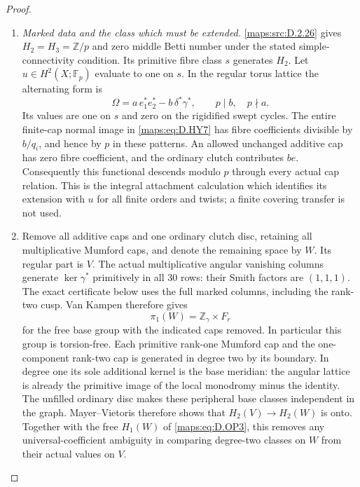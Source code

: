 \begin{proof}
\begin{enumerate}[label=\arabic*.,leftmargin=*]
\item \emph{Marked data and the class which must be extended.}
\ref{maps:src:D.2.26} gives $H_2=H_3=\mathbb Z/p$ and zero middle Betti number
under the stated simple-connectivity condition. Its primitive fibre
class $s$ generates $H_2$. Let $u\in H^2(X;\mathbb F_p)$ evaluate
to one on $s$. In the regular torus lattice the alternating form is
\[
 \Omega=a\,e_1^*e_2^*-b\,\delta^*\gamma^*,\qquad p\mid b,
                                      \quad p\nmid a.
 \tag{D.OP2}\label{maps:eq:D.OP2}
\]
Its values are one on $s$ and zero on the rigidified swept cycles.
The entire finite-cap normal image in \eqref{maps:eq:D.HY7} has fibre
coefficients divisible by $b/q_i$, and hence by $p$ in these
patterns. An allowed unchanged additive cap has zero fibre
coefficient, and the ordinary clutch contributes $be$.
Consequently this functional descends modulo $p$ through every
actual cap relation. This is the integral attachment calculation
which identifies its extension with $u$ for all finite orders
and twists; a finite covering transfer is not used.

\item Remove all additive caps and one ordinary clutch disc, retaining
all multiplicative Mumford caps, and denote the remaining space by
$W$. Its regular part is $V$. The actual multiplicative angular
vanishing columns generate $\ker\gamma^*$ primitively in all
$30$ rows: their Smith factors are $(1,1,1)$. The exact certificate
below uses the full marked columns, including the rank-two cusp.
Van Kampen therefore gives
\[
                  \pi_1(W)=\mathbb Z_\gamma\times F_r
 \tag{D.OP3}\label{maps:eq:D.OP3}
\]
for the free base group with the indicated caps removed. In
particular this group is torsion-free. Each primitive rank-one
Mumford cap and the one-component rank-two cap is generated in
degree two by its boundary. In degree one its sole additional
kernel is the base meridian: the angular lattice is already the
primitive image of the local monodromy minus the identity.
The unfilled ordinary disc makes these peripheral base classes
independent in the graph. Mayer--Vietoris therefore shows that
$H_2(V)\to H_2(W)$ is onto. Together with the free $H_1(W)$ of
\eqref{maps:eq:D.OP3}, this removes any universal-coefficient ambiguity in
comparing degree-two classes on $W$ from their actual values on $V$.


\end{enumerate}
\end{proof}
